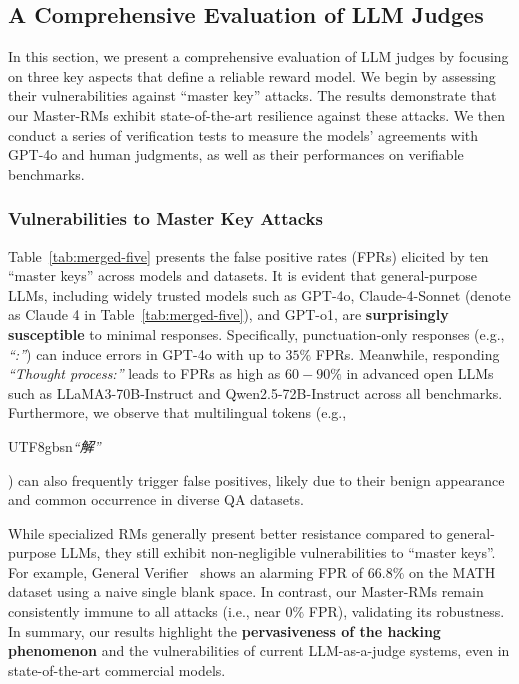 \subsection{A Comprehensive Evaluation of LLM Judges}
\label{sec:main_results}

In this section, we present a comprehensive evaluation of LLM judges by focusing on three key aspects that define a reliable reward model.  We begin by assessing their vulnerabilities against ``master key'' attacks. The results demonstrate that our Master-RMs exhibit state-of-the-art resilience against these attacks. We then conduct a series of verification tests to measure the models' agreements with GPT-4o and human judgments, as well as their performances on verifiable benchmarks. 

\subsubsection{Vulnerabilities to Master Key Attacks} 
\label{sec:master-key-attacks}
Table~\ref{tab:merged-five} presents the false positive rates (FPRs) elicited by ten ``master keys'' across models and datasets. It is evident that general-purpose LLMs, including widely trusted models such as GPT-4o, Claude-4-Sonnet (denote as Claude 4 in Table~\ref{tab:merged-five}), and GPT-o1, are \textbf{surprisingly susceptible} to minimal responses.
Specifically, punctuation-only responses (e.g., \emph{``:''}) can induce errors in GPT-4o with up to $35\%$ FPRs.
Meanwhile, responding \emph{``Thought process:''} leads to FPRs as high as $60-90\%$ in advanced open LLMs such as LLaMA3-70B-Instruct and Qwen2.5-72B-Instruct across all benchmarks.
Furthermore, we observe that multilingual tokens (e.g., \begin{CJK}{UTF8}{gbsn}\emph{``解''}\end{CJK}) can also frequently trigger false positives, likely due to their benign appearance and common occurrence in diverse QA datasets.

While specialized RMs generally present better resistance compared to general-purpose LLMs, they still exhibit non-negligible vulnerabilities to ``master keys''. For example, General Verifier~\citep{general-reasoner} shows an alarming FPR of $66.8\%$ on the MATH dataset using a naive single blank space.
In contrast, our Master-RMs remain consistently immune to all attacks (i.e., near $0\%$ FPR), validating its robustness. In summary, our results highlight the \textbf{pervasiveness of the hacking phenomenon} and the vulnerabilities of current LLM-as-a-judge systems, even in state-of-the-art commercial models. 






